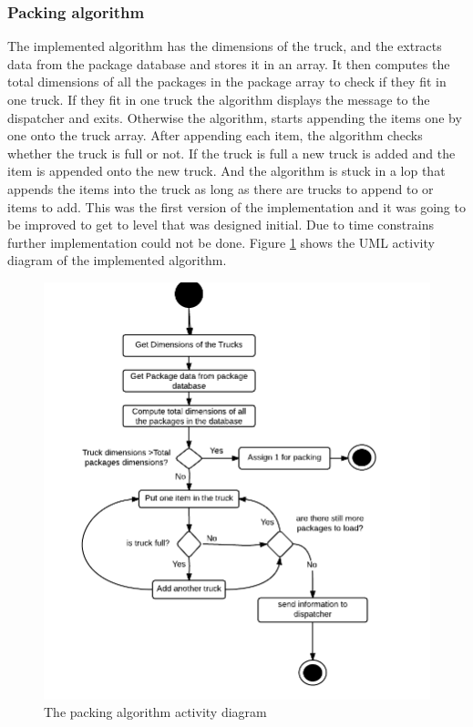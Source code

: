 \documentclass[paper=a4, fontsize=11pt]{scrartcl} %
\numberwithin{equation}{section} %
\numberwithin{figure}{section} %
\numberwithin{table}{section} %
\begin{document}
\subsubsection*{Packing algorithm}
The implemented algorithm has the dimensions of the truck, and the extracts data from the package database and stores it in an array. It then computes the total dimensions of all the packages in the package array to check if they fit in one truck. If they fit in one truck the algorithm displays the message to the dispatcher and exits. Otherwise the algorithm, starts appending the items one by one onto the truck array. After appending each item, the algorithm checks whether the truck is full or not. If the truck is full a new truck is added and the item is appended onto the new truck.  And the algorithm is stuck in a lop that appends the items into the truck as long as there are trucks to append to or items to add. This was the first version of the implementation and it was going to be improved to get to level that was designed initial. Due to time constrains further implementation could not be done. Figure \ref{PackActivity} shows the UML activity diagram of the implemented algorithm. 

\begin{figure}[hbt!]
\centering
\includegraphics[width=4.5in]{pictures/ActivityDiagramPacking.png}
\caption{The packing algorithm activity diagram}
\label{PackActivity}
\end{figure}
\end{document}

